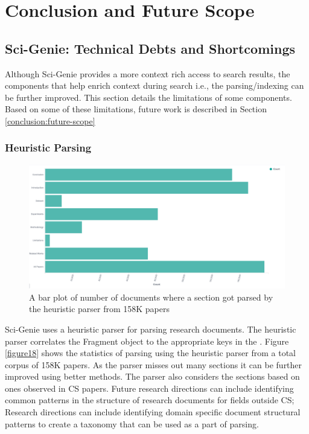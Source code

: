 \chapter{Conclusion and Future Scope}
\label{conclusion}

\section{Sci-Genie: Technical Debts and Shortcomings}
Although Sci-Genie provides a more context rich access to search results, the components that help enrich context during search i.e., the parsing/indexing can be further improved. This section details the limitations of some components. Based on some of these limitations, future work is described in Section \ref{conclusion:future-scope}

\subsection{Heuristic Parsing}
\begin{figure}[h]
    \centering
    \includegraphics[width=\maxwidth{\textwidth}]{src/images/parsing-stats.pdf}
    \caption{ A bar plot of number of documents where a section got parsed by the heuristic parser from 158K papers}
    \label{figure\arabic{figurecounter}}
\end{figure}
Sci-Genie uses a heuristic parser for parsing research documents. The heuristic parser correlates the Fragment object to the appropriate keys in the . Figure \ref{figure18} shows the statistics of parsing using the heuristic parser from a total corpus of 158K papers. As the parser misses out many sections it can be further improved using better methods. The parser also considers the sections based on ones observed in CS papers. Future research directions can include identifying common patterns in the structure of research documents for fields outside CS; Research directions can include identifying domain specific document structural patterns to create a taxonomy that can be used as a part of parsing.


